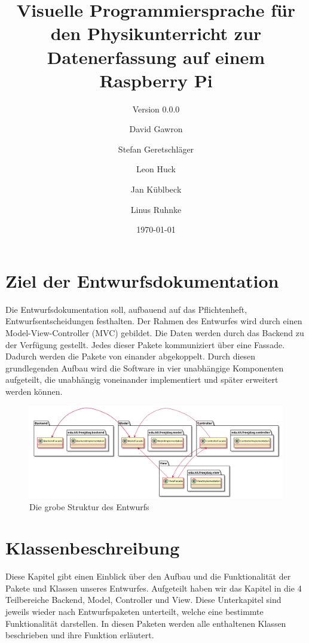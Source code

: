 \documentclass[parskip=full]{scrartcl}
\title{Visuelle Programmiersprache für den Physikunterricht zur Datenerfassung auf einem Raspberry Pi}
\subtitle{Version 0.0.0}
\author{David Gawron \and Stefan Geretschläger \and Leon Huck \and Jan Küblbeck \and Linus Ruhnke}
\date{\today}
\begin{document}
\maketitle

\clearpage
\tableofcontents 					%

\clearpage
\section{Ziel der Entwurfsdokumentation} \label{einleitung}
Die Entwurfsdokumentation soll, aufbauend auf das Pflichtenheft, Entwurfsentscheidungen festhalten. Der Rahmen des Entwurfes wird durch einen \gls{Model-View-Controller} (MVC) gebildet. Die Daten werden durch das Backend zu der Verfügung gestellt. Jedes dieser Pakete kommuniziert über eine Fassade. Dadurch werden die Pakete von einander abgekoppelt.
Durch diesen grundlegenden Aufbau wird die Software in vier unabhängige Komponenten aufgeteilt, die unabhängig voneinander implementiert und später erweitert werden können.

\begin{figure}[htbp]
	\begin{center}
		\includegraphics[width = 14cm]{Grafiken/Grober_Aufbau.png}
		\caption{Die grobe Struktur des Entwurfs}
		\label{Entwurf_Grob}
	\end{center}
\end{figure}


\clearpage
\section{Klassenbeschreibung}

Diese Kapitel gibt einen Einblick über den Aufbau und die Funktionalität der Pakete und Klassen unseres Entwurfes. Aufgeteilt haben wir das Kapitel in die 4 Teilbereiche Backend, Model, Controller und View. Diese Unterkapitel sind jeweils wieder nach Entwurfspaketen unterteilt, welche eine bestimmte Funktionalität darstellen. In diesen Paketen werden alle enthaltenen Klassen beschrieben und ihre Funktion erläutert.
\end{document}
